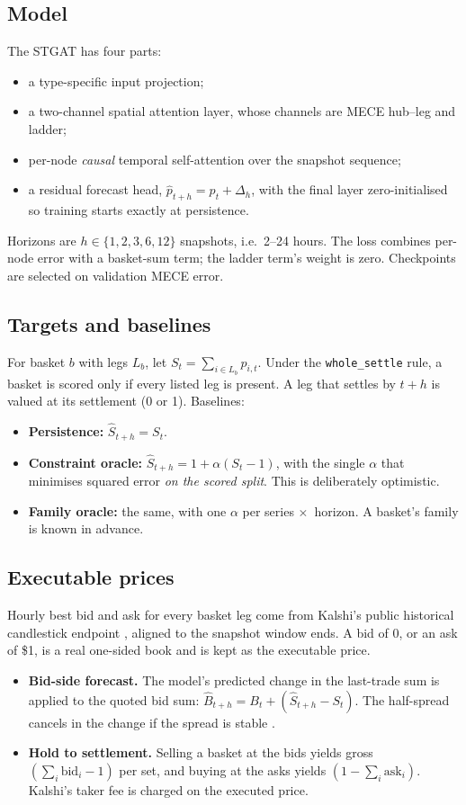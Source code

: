 \documentclass[11pt,a4paper]{article}
\newcommand{\x}{\ensuremath{\times}}
\begin{document}
\subsection{Model}
The STGAT has four parts:
\begin{itemize}
  \item a type-specific input projection;
  \item a two-channel spatial attention layer, whose channels are MECE hub--leg
    and ladder;
  \item per-node \emph{causal} temporal self-attention over the snapshot sequence;
  \item a residual forecast head, $\hat p_{t+h} = p_t + \Delta_h$, with the final
    layer zero-initialised so training starts exactly at persistence.
\end{itemize}
Horizons are $h\in\{1,2,3,6,12\}$ snapshots, i.e.\ 2--24 hours. The loss combines
per-node error with a basket-sum term; the ladder term's weight is zero.
Checkpoints are selected on validation MECE error.

\subsection{Targets and baselines}
For basket $b$ with legs $L_b$, let $S_t=\sum_{i\in L_b} p_{i,t}$. Under the
\texttt{whole\_settle} rule, a basket is scored only if every listed leg is
present. A leg that settles by $t+h$ is valued at its settlement (0 or 1).
Baselines:
\begin{itemize}
  \item \textbf{Persistence:} $\hat S_{t+h}=S_t$.
  \item \textbf{Constraint oracle:} $\hat S_{t+h}=1+\alpha(S_t-1)$, with the single
    $\alpha$ that minimises squared error \emph{on the scored split}. This is
    deliberately optimistic.
  \item \textbf{Family oracle:} the same, with one $\alpha$ per series \x\
    horizon. A basket's family is known in advance.
\end{itemize}

\subsection{Executable prices}
Hourly best bid and ask for every basket leg come from Kalshi's public historical
candlestick endpoint \cite{kalshiapi}, aligned to the snapshot window ends.
A bid of 0, or an ask of \$1, is a real one-sided book and is kept as the
executable price.
\begin{itemize}
  \item \textbf{Bid-side forecast.} The model's predicted change in the
    last-trade sum is applied to the quoted bid sum:
    $\hat B_{t+h} = B_t + (\hat S_{t+h}-S_t)$. The half-spread cancels in the
    change if the spread is stable \cite{roll1984}.
  \item \textbf{Hold to settlement.} Selling a basket at the bids yields gross
    $(\sum_i \mathrm{bid}_i - 1)$ per set, and buying at the asks yields
    $(1-\sum_i \mathrm{ask}_i)$. Kalshi's taker fee is charged on the executed
    price.
\end{itemize}
\end{document}
